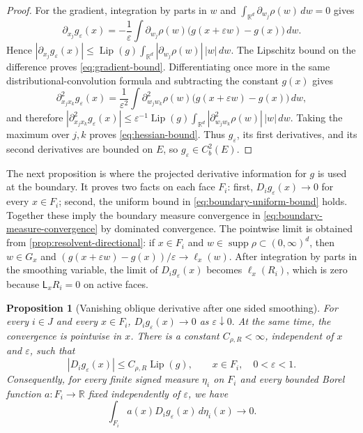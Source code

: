 \documentclass[aihp]{imsart}
\numberwithin{equation}{section}
\theoremstyle{plain}
\newtheorem{proposition}[proposition]{Proposition}
\theoremstyle{definition}
\newcommand{\supp}{\operatorname{supp}}
\newcommand{\1}{\mathbf 1}
\begin{document}
\begin{proof}
For the gradient, integration by parts in $w$ and $\int_{\mathbb R^d}\partial_{w_j}\rho(w)\,dw=0$  gives
\begin{equation}\label{eq:partial-mollifier}
 \partial_{x_j}g_\varepsilon(x)
 =-\frac1\varepsilon\int \partial_{w_j}\rho(w)
 \bigl(g(x+\varepsilon w)-g(x)\bigr)\,dw.
\end{equation}
Hence $|\partial_{x_j}g_\varepsilon(x)| \le \operatorname{Lip}(g) \int_{\mathbb R^d} |\partial_{w_j}\rho(w)|\,|w|\,dw .$ The Lipschitz bound on the difference proves \eqref{eq:gradient-bound}. Differentiating once more in the same distributional-convolution formula and subtracting the constant $g(x)$ gives
\[
 \partial_{x_jx_k}^2g_\varepsilon(x)
 =\frac1{\varepsilon^2}\int \partial_{w_jw_k}^2\rho(w)
 \bigl(g(x+\varepsilon w)-g(x)\bigr)\,dw,
\]
and therefore $|\partial_{x_jx_k}^2g_\varepsilon(x)|\le
\varepsilon^{-1}\operatorname{Lip}(g)\int_{\mathbb R^d} |\partial_{w_jw_k}^2\rho(w)|\,|w|\,dw .$ Taking the maximum over \(j,k\) proves \eqref{eq:hessian-bound}. Thus $g_\varepsilon$, its first derivatives, and its second derivatives are bounded on $E$, so $g_\varepsilon\in C_b^2(E)$.
\end{proof}

The next proposition is where the projected derivative information for $g$ is used at the boundary. It proves two facts on each face $F_i$: first, $D_i g_\varepsilon(x)\to0$ for every $x\in F_i$; second, the uniform bound in \eqref{eq:boundary-uniform-bound} holds. Together these imply the boundary measure convergence in \eqref{eq:boundary-measure-convergence} by dominated convergence. The pointwise limit is obtained from \cref{prop:resolvent-directional}: if $x\in F_i$ and $w\in\supp\rho\subset(0,\infty)^d$, then $w\in G_x$ and $(g(x+\varepsilon w)-g(x))/\varepsilon\to\ell_x(w)$. After integration by parts in the smoothing variable, the limit of $D_i g_\varepsilon(x)$ becomes $\ell_x(R_i)$, which is zero because $\mathsf L_xR_i=0$ on active faces.

\begin{proposition}[Vanishing oblique derivative after one sided smoothing]\label{prop:vanishing-derivative}
For every \(i\in J\) and every \(x\in F_i\), $D_i g_\varepsilon(x)\longrightarrow 0$ as  $\varepsilon\downarrow0.$ At the same time, the convergence is pointwise in \(x\). There is a constant
\(C_{\rho,R}<\infty\), independent of \(x\) and \(\varepsilon\), such that
\begin{equation}\label{eq:boundary-uniform-bound}
|D_i g_\varepsilon(x)|
\le
C_{\rho,R}\operatorname{Lip}(g),
\qquad
x\in F_i,\quad 0<\varepsilon<1 .
\end{equation}
Consequently, for every finite signed measure \(\eta_i\) on \(F_i\) and every
bounded Borel function \(a:F_i\to\mathbb R\) fixed independently of
\(\varepsilon\), we have 
\begin{equation}\label{eq:boundary-measure-convergence}
    \int_{F_i} a(x)D_i g_\varepsilon(x)\,d\eta_i(x)
\longrightarrow 0 .
\end{equation}
\end{proposition}
\end{document}
